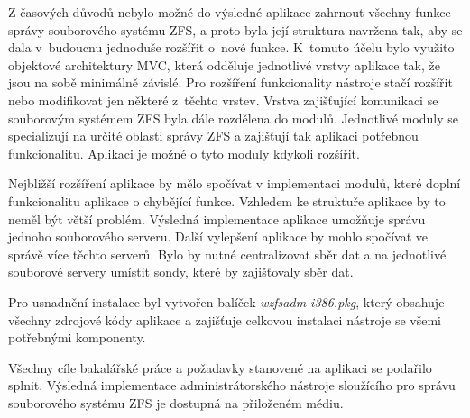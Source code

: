 Z časových důvodů nebylo možné do výsledné aplikace zahrnout všechny funkce správy souborového systému ZFS, a proto byla její struktura navržena tak, aby se dala v~budoucnu jednoduše rozšířit o~nové funkce. K~tomuto účelu bylo využito objektové architektury MVC, která odděluje jednotlivé vrstvy aplikace tak, že jsou na sobě minimálně závislé. Pro rozšíření funkcionality nástroje stačí rozšířit nebo modifikovat jen některé z~těchto vrstev. Vrstva zajišťující komunikaci se souborovým systémem ZFS byla dále rozdělena do modulů. Jednotlivé moduly se specializují na určité oblasti správy ZFS a zajišťují tak aplikaci potřebnou funkcionalitu. Aplikaci je možné o tyto moduly kdykoli rozšířit.

Nejbližší rozšíření aplikace by mělo spočívat v implementaci modulů, které doplní funkcionalitu aplikace o chybějící funkce. Vzhledem ke struktuře aplikace by to neměl být větší problém. Výsledná implementace aplikace umožňuje správu jednoho souborového serveru. Další vylepšení aplikace by mohlo spočívat ve správě více těchto serverů. Bylo by nutné centralizovat sběr dat a na jednotlivé souborové servery umístit sondy, které by zajišťovaly sběr dat.

Pro usnadnění instalace byl vytvořen balíček \emph{wzfsadm-i386.pkg}, který obsahuje všechny zdrojové kódy aplikace a zajišťuje celkovou instalaci nástroje se všemi potřebnými komponenty.

Všechny cíle bakalářské práce a požadavky stanovené na aplikaci se podařilo splnit. Výsledná implementace administrátorského nástroje sloužícího pro správu souborového systému ZFS je dostupná na přiloženém médiu.




